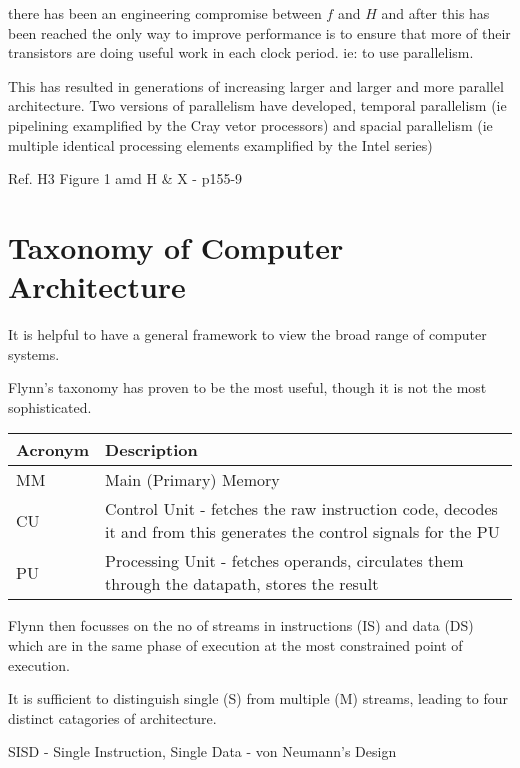 \documentclass[a4paper,12pt]{article}
\begin{document}
there has been an engineering compromise between $f$ and $H$ and after
this has been reached the only way to improve performance is to ensure
that more of their transistors are doing useful work in each clock
period. ie: to use parallelism.

This has resulted in generations of increasing larger and larger and
more parallel architecture. Two versions of parallelism have developed,
temporal parallelism (ie pipelining examplified by the Cray vetor
processors) and spacial parallelism (ie multiple identical processing
elements examplified by the Intel series)

Ref. H3 Figure 1 amd H \& X - p155-9

\section*{Taxonomy of Computer Architecture}

It is helpful to have a general framework to view the broad range of
computer systems.

Flynn's taxonomy has proven to be the most useful, though it is not the
most sophisticated.

\begin{tabularx}{\linewidth}{|l|X|}
\hline
Acronym	&	Description											\\
\hline
MM		 	&	Main (Primary) Memory							\\
\hline
CU		 	&	Control Unit - fetches the raw instruction code, decodes
it and from this generates the control signals for the PU	\\
\hline
PU			&	Processing Unit - fetches operands, circulates them
through the datapath, stores the result							\\
\hline
\end{tabularx}

Flynn then focusses on the no of streams in instructions (IS) and data
(DS) which are in the same phase of execution at the most constrained
point of execution.

It is sufficient to distinguish single (S) from multiple (M) streams,
leading to four distinct catagories of architecture.

SISD - Single Instruction, Single Data - von Neumann's Design
\end{document}
